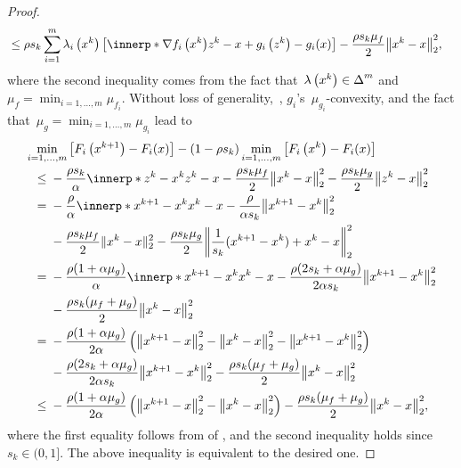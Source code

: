 \documentclass[../../main]{subfiles}
\begin{document}
\begin{proof}
\begin{align}
         & \le \rho s_k \sum_{i = 1}^{m} \lambda_i\left(x^k\right) \left[ \innerp*{\nabla f_i\left(x^k\right)}{z^k - x} + g_i\left(z^k\right) - g_i(x) \right] - \frac{\rho s_k \mu_f}{2} \norm*{x^k - x}_2^2
        ,\end{align}
    where the second inequality comes from the fact that~$\lambda\left(x^k\right) \in \operatorname{\Delta}^m$ and~$\mu_f = \min_{i = 1, \dots, m} \mu_{f_i}$.
    Without loss of generality,~, $g_i$'s~$\mu_{g_i}$-convexity, and the fact that~$\mu_g = \min_{i = 1, \dots, m} \mu_{g_i}$ lead to
    \begin{align}
        \MoveEqLeft \min_{i = 1, \dots, m} \left[F_i\left(x^{k + 1}\right) - F_i(x)\right] - (1 - \rho s_k) \min_{i = 1, \dots, m} \left[F_i\left(x^k\right) - F_i(x)\right]       \\
        \le{} & - \frac{\rho s_k}{\alpha} \innerp*{z^k - x^k}{z^k - x} - \frac{\rho s_k \mu_f}{2} \norm*{x^k - x}_2^2 - \frac{\rho s_k \mu_g}{2} \norm*{z^k - x}_2^2               \\
        ={}   & - \frac{\rho}{\alpha} \innerp*{x^{k + 1} - x^k}{x^k - x} - \frac{\rho}{\alpha s_k} \norm*{x^{k + 1} - x^k}_2^2                                                     \\
              & - \frac{\rho s_k \mu_f}{2} \norm{x^k - x}_2^2 - \frac{\rho s_k \mu_g}{2} \norm*{\frac{1}{s_k} (x^{k + 1} - x^k) + x^k - x}_2^2                                     \\
        ={}   & - \frac{\rho (1 + \alpha \mu_g)}{\alpha} \innerp*{x^{k + 1} - x^k}{x^k - x} - \frac{\rho (2 s_k + \alpha \mu_g)}{2 \alpha s_k} \norm*{x^{k + 1} - x^k}_2^2         \\
              & - \frac{\rho s_k (\mu_f + \mu_g)}{2} \norm*{x^k - x}_2^2                                                                                                           \\
        ={}   & - \frac{\rho (1 + \alpha \mu_g)}{2 \alpha} \left( \norm*{x^{k + 1} - x}_2^2 - \norm*{x^k - x}_2^2 - \norm*{x^{k + 1} - x^k}_2^2 \right)                            \\
              & - \frac{\rho (2 s_k + \alpha \mu_g)}{2 \alpha s_k} \norm*{x^{k + 1} - x^k}_2^2 - \frac{\rho s_k (\mu_f + \mu_g)}{2} \norm*{x^k - x}_2^2                            \\
        \le{} & - \frac{\rho (1 + \alpha \mu_g)}{2 \alpha} \left( \norm*{x^{k + 1} - x}_2^2 - \norm*{x^k - x}_2^2 \right) - \frac{\rho s_k (\mu_f + \mu_g)}{2} \norm*{x^k - x}_2^2
        ,\end{align}
    where the first equality follows from  of , and the second inequality holds since~$s_k \in (0, 1]$.
    The above inequality is equivalent to the desired one.


\end{proof}
\end{document}
